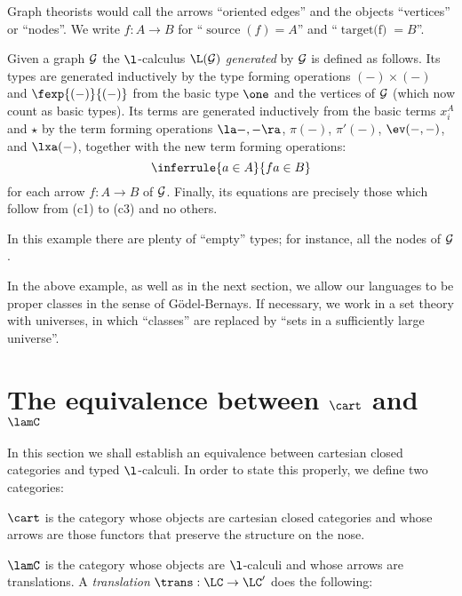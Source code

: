 \begin{center}
\end{center}

Graph theorists would call the arrows ``oriented edges'' and the objects
``vertices'' or ``nodes''. We write $f: A \to B$ for ``$\mathop\text{source}(f) = A$'' and
``$\mathop{\text{target(f)}} = B$''.

\begin{example}
Given a graph $\cal G$ the $\l$-calculus $\L(\cal G)$ {\em generated} by $\cal G$
is defined as follows. Its types are generated inductively by the type forming
operations $(-)\times(-)$ and $\fexp{(-)}{(-)}$ from the basic type $\one$
and the vertices of $\cal G$ (which now count as basic types).
Its terms are generated inductively
from the basic terms $x_i^A$ and $\star$ by the term forming operations
$\la -,-\ra$, $\pi(-)$, $\pi'(-)$, $\ev(-,-)$, and $\lxa(-)$,
together with the new term forming operations:
\[
\inferrule{a \in A}{f a \in B}
\]
for each arrow $f: A \to B$ of $\cal G$. Finally, its equations are precisely those
which follow from (c1) to (c3) and no others.

In this example there are plenty of ``empty'' types; for instance, all the
nodes of $\cal G$.
\end{example}
In the above example, as well as in the next section, we allow our
languages to be proper classes in the sense of G\"odel-Bernays. If necessary,
we work in a set theory with universes, in which ``classes'' are replaced by
``sets in a sufficiently large universe''.


\section{The equivalence between $\cart$ and $\lamC$}

In this section we shall establish an equivalence between cartesian closed
categories and typed $\l$-calculi. In order to state this properly, we define
two categories:

$\cart$ is the category whose objects are cartesian closed categories and
whose arrows are those functors that preserve the structure on the nose.

$\lamC$ is the category whose objects are $\l$-calculi and whose arrows are
{translations}. A {\em translation} $\trans: \LC \to \LC'$ does the following:

